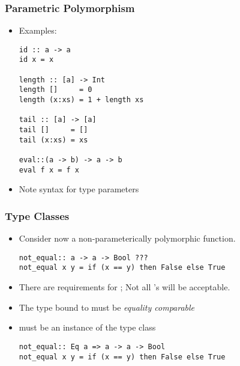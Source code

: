 \documentclass{beamer}
\newcommand{\ttcode}[1]{{\color{red}{\tt{#1}}}}
\begin{document}
\begin{frame}[fragile]
    \frametitle{Parametric Polymorphism}
\begin{itemize}
\item Examples: 
{\color{red}
\begin{verbatim}
id :: a -> a 
id x = x 

length :: [a] -> Int 
length []     = 0 
length (x:xs) = 1 + length xs
 
tail :: [a] -> [a] 
tail []     = [] 
tail (x:xs) = xs 

eval::(a -> b) -> a -> b 
eval f x = f x 
\end{verbatim}
}
\item Note syntax for type parameters 
\end{itemize}
\end{frame}




\begin{frame}[fragile]
    \frametitle{Type Classes}
\begin{itemize}
\item Consider now a non-parameterically polymorphic function. 
{\color{red}
\begin{verbatim}
not_equal:: a -> a -> Bool ??? 
not_equal x y = if (x == y) then False else True 
\end{verbatim}
}

\pause
\item There are requirements for \ttcode{a};  
Not all \ttcode{a}'s will be acceptable. 

\pause
\item The type bound to \ttcode{a} must be \emph{equality 
comparable}

\pause
\item
\ttcode{a} must be an instance of the type class \ttcode{Eq}
{\color{red}
\begin{verbatim}
not_equal:: Eq a => a -> a -> Bool 
not_equal x y = if (x == y) then False else True 
\end{verbatim}
}

\end{itemize}
\end{frame}
\end{document}
